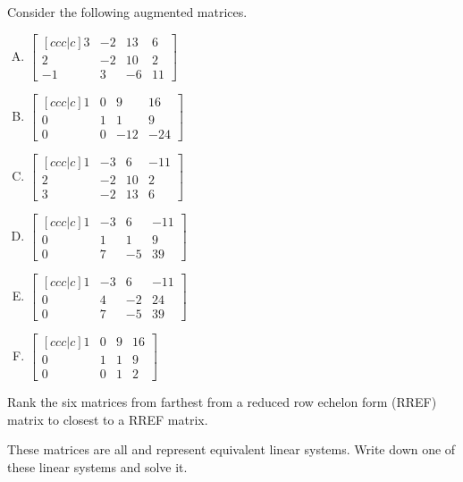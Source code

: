 \begin{applicationActivities}
\begin{activity}{10}
Consider the following augmented matrices.
\begin{multicols}{3}
\begin{enumerate}[(A)]
\item \( \begin{bmatrix}[ccc|c] 3 & -2 & 13 & 6 \\ 2 & -2 & 10 & 2 \\ -1 & 3 & -6 & 11 \end{bmatrix} \)
\item \( \begin{bmatrix}[ccc|c] 1 & 0 & 9 & 16 \\ 0 & 1 & 1 & 9 \\ 0 & 0 & -12 & -24 \end{bmatrix} \)
\item \( \begin{bmatrix}[ccc|c] 1 & -3 & 6 & -11 \\ 2 & -2 & 10 & 2 \\ 3 & -2 & 13 & 6 \end{bmatrix} \)
\item \( \begin{bmatrix}[ccc|c] 1 & -3 & 6 & -11 \\ 0 & 1 & 1 & 9 \\ 0 & 7 & -5 & 39 \end{bmatrix} \)
\item \( \begin{bmatrix}[ccc|c] 1 & -3 & 6 & -11 \\ 0 & 4 & -2 & 24 \\ 0 & 7 & -5 & 39 \end{bmatrix} \)
\item \( \begin{bmatrix}[ccc|c] 1 & 0 & 9 & 16 \\ 0 & 1 & 1 & 9 \\ 0 & 0 & 1 & 2 \end{bmatrix} \)
\end{enumerate}
\end{multicols}
\begin{subactivity}
Rank the six matrices from farthest from a reduced row echelon form (RREF) matrix to closest to a RREF matrix.
\end{subactivity}
\begin{subactivity}
These matrices are all  and represent equivalent linear systems.
Write down one of these linear systems and solve it.
\end{subactivity}
\end{activity}


\end{applicationActivities}
